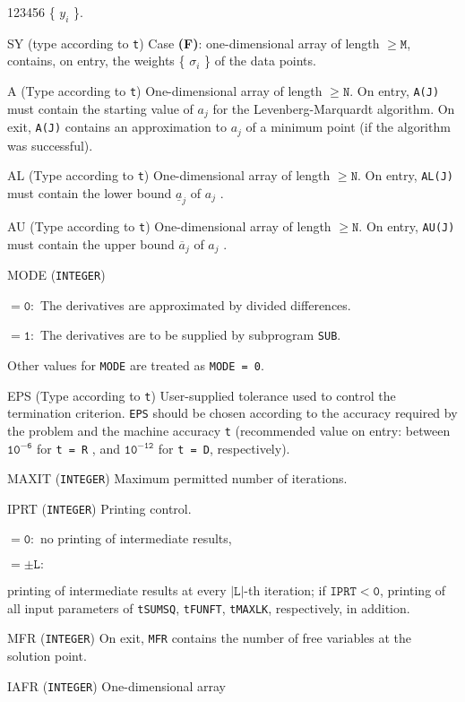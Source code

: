 \begin{DLtt}{123456}
 \{ $y_i$ \}.
\item[SY] (type according to {\tt t}) Case {\bf (F)}: one-dimensional
array of length $\mathtt{ \ge M}$, contains, on entry, the weights
\{ $\sigma_i$ \} of the data points.
\item[A] (Type according to {\tt t}) One-dimensional array of length
$\mathtt{\ge N}$. On entry, {\tt A(J)} must contain the starting
value of $a_j$ for the Levenberg-Marquardt algorithm.
On exit, {\tt A(J)} contains an approximation to $a_j$ of a minimum
point (if the algorithm was successful).
\item[AL] (Type according to {\tt t}) One-dimensional array of length
$\mathtt{\ge N}$. On entry, {\tt AL(J)} must contain the lower bound
$\underline{a}_j$   of $a_j$  .
\item[AU] (Type according to {\tt t}) One-dimensional array of length
$\mathtt{\ge N}$. On entry, {\tt AU(J)} must contain the upper
bound $\overline{a}_j$ of $a_j$  .
\item[MODE] ({\tt INTEGER})
\item[] $\mathtt{ = 0:}$ The derivatives are approximated by divided
                         differences.
\item[] $\mathtt{ = 1:}$ The derivatives are to be supplied by subprogram
                         {\tt SUB}.
\item[] Other values for {\tt MODE} are treated as {\tt MODE = 0}.
\item[EPS] (Type according to {\tt t}) User-supplied tolerance used to
control the termination criterion. {\tt EPS} should be chosen according
to the accuracy required by the problem and the machine
accuracy {\tt t} (recommended value on entry: between
$\mathtt{10^{-6}}$ for {\tt t = R} , and $\mathtt{ 10^{-12}}$ for
{\tt t = D}, respectively).
\item[MAXIT] ({\tt INTEGER}) Maximum permitted number of iterations.
\item[IPRT] ({\tt INTEGER}) Printing control.
\item[] $\mathtt{ = 0:}$ no printing of intermediate results,
\item[] $\mathtt{ = \pm L:}$ \parbox[t]{136mm}{
printing of intermediate results at
every $\mathtt{|L|}$-th iteration; if $\mathtt{IPRT < 0}$, printing of
all input parameters of {\tt tSUMSQ}, {\tt tFUNFT}, {\tt tMAXLK},
respectively, in addition.}
\item[MFR] ({\tt INTEGER}) On exit, {\tt MFR} contains the number of
free variables at the solution point.
\item[IAFR] ({\tt INTEGER}) One-dimensional array

\end{DLtt}
